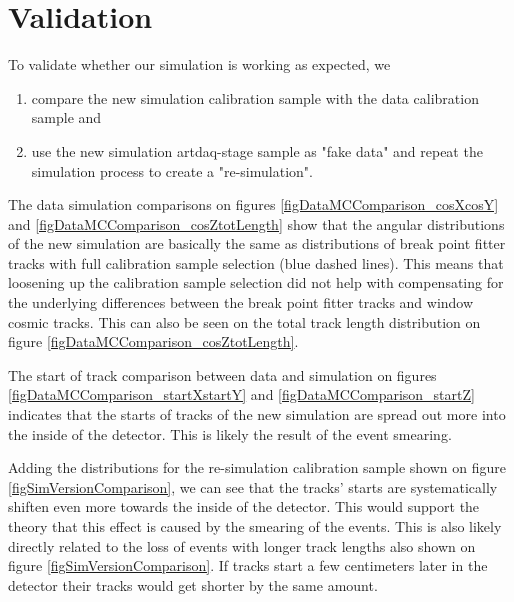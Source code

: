 \documentclass[12pt]{article}
\begin{document}
\section{Validation}
To validate whether our simulation is working as expected, we
\begin{enumerate}
\item compare the new simulation calibration sample with the data calibration sample and
\item use the new simulation artdaq-stage sample as "fake data" and repeat the simulation process to create a "re-simulation".
\end{enumerate}

The data simulation comparisons on figures \ref{figDataMCComparison_cosXcosY} and \ref{figDataMCComparison_cosZtotLength} show that the angular distributions of the new simulation are basically the same as distributions of break point fitter tracks with full calibration sample selection (blue dashed lines). This means that loosening up the calibration sample selection did not help with compensating for the underlying differences between the break point fitter tracks and window cosmic tracks. This can also be seen on the total track length distribution on figure \ref{figDataMCComparison_cosZtotLength}.

The start of track comparison between data and simulation on figures \ref{figDataMCComparison_startXstartY} and \ref{figDataMCComparison_startZ} indicates that the starts of tracks of the new simulation are spread out more into the inside of the detector. This is likely the result of the event smearing.

Adding the distributions for the re-simulation calibration sample shown on figure \ref{figSimVersionComparison}, we can see that the tracks' starts are systematically shiften even more towards the inside of the detector. This would support the theory that this effect is caused by the smearing of the events. This is also likely directly related to the loss of events with longer track lengths also shown on figure \ref{figSimVersionComparison}. If tracks start a few centimeters later in the detector their tracks would get shorter by the same amount.
\end{document}

